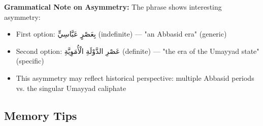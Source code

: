 \documentclass[letterpaper,12pt]{article}
\begin{document}
\begin{tcolorbox}[breakable,colback=boxcolor,colframe=accentcolor,title=\textbf{Cultural and Historical Context}]
\textbf{Grammatical Note on Asymmetry:}
The phrase shows interesting asymmetry:
\begin{itemize}
\item First option: \textarabic{بِعَصْرٍ عَبَّاسِيٍّ} (indefinite) — "an Abbasid era" (generic)
\item Second option: \textarabic{عَصْرِ الدَّوْلَةِ الْأُمَوِيَّةِ} (definite) — "the era of the Umayyad state" (specific)
\item This asymmetry may reflect historical perspective: multiple Abbasid periods vs. the singular Umayyad caliphate
\end{itemize}
\end{tcolorbox}

\subsection{Memory Tips}
\end{document}
